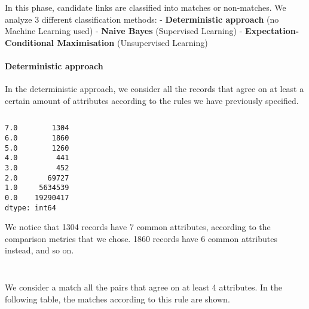 \documentclass{article}
\begin{document}
In this phase, candidate links are classified into matches or
non-matches. We analyze 3 different classification methods: -
\textbf{Deterministic approach} (no Machine Learning used) -
\textbf{Naive Bayes} (Supervised Learning) -
\textbf{Expectation-Conditional Maximisation} (Unsupervised Learning)

\hypertarget{deterministic-approach}{%
\paragraph{Deterministic approach}\label{deterministic-approach}}

In the deterministic approach, we consider all the records that agree on
at least a certain amount of attributes according to the rules we have
previously specified.

    \begin{Verbatim}[commandchars=\\\{\}]

\end{Verbatim}
\begin{Verbatim}[commandchars=\\\{\}]
7.0        1304
6.0        1860
5.0        1260
4.0         441
3.0         452
2.0       69727
1.0     5634539
0.0    19290417
dtype: int64
\end{Verbatim}
    We notice that 1304 records have 7 common attributes, according to the
comparison metrics that we chose. 1860 records have 6 common attributes
instead, and so on.

    \begin{Verbatim}[commandchars=\\\{\}]

\end{Verbatim}
\begin{Verbatim}[commandchars=\\\{\}]

\end{Verbatim}
    We consider a match all the pairs that agree on at least 4 attributes.
In the following table, the matches according to this rule are shown.
\end{document}
